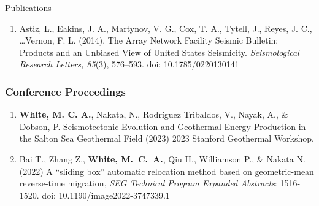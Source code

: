\begin{rSection}{Publications}
\begin{enumerate}
		\item Astiz, L., Eakins, J. A., Martynov, V. G., Cox, T. A., Tytell, J., Reyes, J. C., \dots Vernon, F. L. (2014). The Array Network Facility Seismic Bulletin: Products and an Unbiased View of United States Seismicity. \textit{Seismological Research Letters, 85}(3), 576–593. doi: 10.1785/0220130141
	\end{enumerate}
	\subsubsection*{Conference Proceedings}
		\begin{enumerate}
			\item \textbf{White, M. C. A.}, Nakata, N., Rodríguez Tribaldos, V., Nayak, A., \& Dobson, P. Seismotectonic Evolution and Geothermal Energy Production in the Salton Sea Geothermal Field (2023) 2023 Stanford Geothermal Workshop.
		
			\item Bai T., Zhang Z., \textbf{White, M.~C.~A.}, Qiu H., Williamson P., \& Nakata N. (2022) A ``sliding box'' automatic relocation method based on geometric-mean reverse-time migration, \textit{SEG Technical Program Expanded Abstracts}: 1516-1520.
			doi: 10.1190/image2022-3747339.1
		\end{enumerate}
\end{rSection}